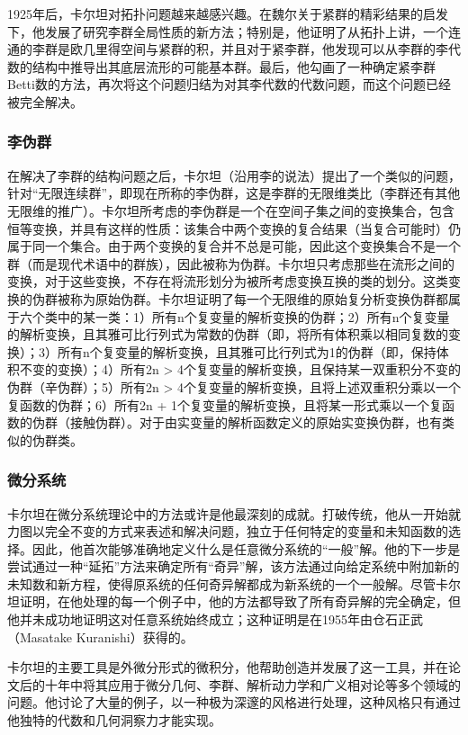 1925年后，卡尔坦对拓扑问题越来越感兴趣。在魏尔关于紧群的精彩结果的启发下，他发展了研究李群全局性质的新方法；特别是，他证明了从拓扑上讲，一个连通的李群是欧几里得空间与紧群的积，并且对于紧李群，他发现可以从李群的李代数的结构中推导出其底层流形的可能基本群。最后，他勾画了一种确定紧李群Betti数的方法，再次将这个问题归结为对其李代数的代数问题，而这个问题已经被完全解决。
\subsubsection{李伪群}  
在解决了李群的结构问题之后，卡尔坦（沿用李的说法）提出了一个类似的问题，针对“无限连续群”，即现在所称的李伪群，这是李群的无限维类比（李群还有其他无限维的推广）。卡尔坦所考虑的李伪群是一个在空间子集之间的变换集合，包含恒等变换，并具有这样的性质：该集合中两个变换的复合结果（当复合可能时）仍属于同一个集合。由于两个变换的复合并不总是可能，因此这个变换集合不是一个群（而是现代术语中的群族），因此被称为伪群。卡尔坦只考虑那些在流形之间的变换，对于这些变换，不存在将流形划分为被所考虑变换互换的类的划分。这类变换的伪群被称为原始伪群。卡尔坦证明了每一个无限维的原始复分析变换伪群都属于六个类中的某一类：1）所有n个复变量的解析变换的伪群；2）所有n个复变量的解析变换，且其雅可比行列式为常数的伪群（即，将所有体积乘以相同复数的变换）；3）所有n个复变量的解析变换，且其雅可比行列式为1的伪群（即，保持体积不变的变换）；4）所有2n > 4个复变量的解析变换，且保持某一双重积分不变的伪群（辛伪群）；5）所有2n > 4个复变量的解析变换，且将上述双重积分乘以一个复函数的伪群；6）所有2n + 1个复变量的解析变换，且将某一形式乘以一个复函数的伪群（接触伪群）。对于由实变量的解析函数定义的原始实变换伪群，也有类似的伪群类。
\subsubsection{微分系统}  
卡尔坦在微分系统理论中的方法或许是他最深刻的成就。打破传统，他从一开始就力图以完全不变的方式来表述和解决问题，独立于任何特定的变量和未知函数的选择。因此，他首次能够准确地定义什么是任意微分系统的“一般”解。他的下一步是尝试通过一种“延拓”方法来确定所有“奇异”解，该方法通过向给定系统中附加新的未知数和新方程，使得原系统的任何奇异解都成为新系统的一个一般解。尽管卡尔坦证明，在他处理的每一个例子中，他的方法都导致了所有奇异解的完全确定，但他并未成功地证明这对任意系统始终成立；这种证明是在1955年由仓石正武（Masatake Kuranishi）获得的。

卡尔坦的主要工具是外微分形式的微积分，他帮助创造并发展了这一工具，并在论文后的十年中将其应用于微分几何、李群、解析动力学和广义相对论等多个领域的问题。他讨论了大量的例子，以一种极为深邃的风格进行处理，这种风格只有通过他独特的代数和几何洞察力才能实现。
